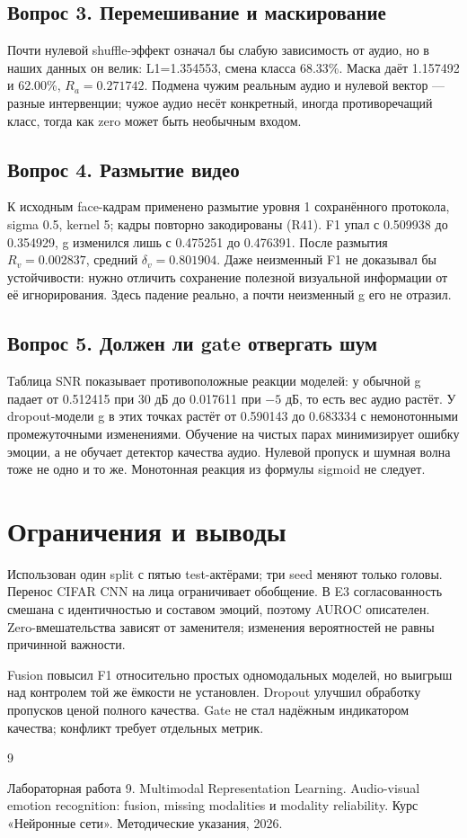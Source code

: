 \subsection*{Вопрос 3. Перемешивание и маскирование}
Почти нулевой shuffle-эффект означал бы слабую зависимость от аудио, но в наших данных он велик: L1=1.354553, смена класса 68.33\%. Маска даёт 1.157492 и 62.00\%, $R_a=0.271742$. Подмена чужим реальным аудио и нулевой вектор --- разные интервенции; чужое аудио несёт конкретный, иногда противоречащий класс, тогда как zero может быть необычным входом.
\subsection*{Вопрос 4. Размытие видео}
К исходным face-кадрам применено размытие уровня 1 сохранённого протокола, sigma 0.5, kernel 5; кадры повторно закодированы (R41). F1 упал с 0.509938 до 0.354929, g изменился лишь с 0.475251 до 0.476391. После размытия $R_v=0.002837$, средний $\delta_v=0.801904$. Даже неизменный F1 не доказывал бы устойчивости: нужно отличить сохранение полезной визуальной информации от её игнорирования. Здесь падение реально, а почти неизменный g его не отразил.
\subsection*{Вопрос 5. Должен ли gate отвергать шум}
Таблица SNR показывает противоположные реакции моделей: у обычной g падает от 0.512415 при 30 дБ до 0.017611 при $-5$ дБ, то есть вес аудио растёт. У dropout-модели g в этих точках растёт от 0.590143 до 0.683334 с немонотонными промежуточными изменениями. Обучение на чистых парах минимизирует ошибку эмоции, а не обучает детектор качества аудио. Нулевой пропуск и шумная волна тоже не одно и то же. Монотонная реакция из формулы sigmoid не следует.

\section{Ограничения и выводы}
Использован один split с пятью test-актёрами; три seed меняют только головы. Перенос CIFAR CNN на лица ограничивает обобщение. В E3 согласованность смешана с идентичностью и составом эмоций, поэтому AUROC описателен. Zero-вмешательства зависят от заменителя; изменения вероятностей не равны причинной важности.

Fusion повысил F1 относительно простых одномодальных моделей, но выигрыш над контролем той же ёмкости не установлен. Dropout улучшил обработку пропусков ценой полного качества. Gate не стал надёжным индикатором качества; конфликт требует отдельных метрик.
\clearpage
\renewcommand{\refname}{Список использованных источников}
\begin{thebibliography}{9}
 Лабораторная работа 9. Multimodal Representation Learning. Audio-visual emotion recognition: fusion, missing modalities и modality reliability. Курс «Нейронные сети». Методические указания, 2026.
\end{thebibliography}
\clearpage
